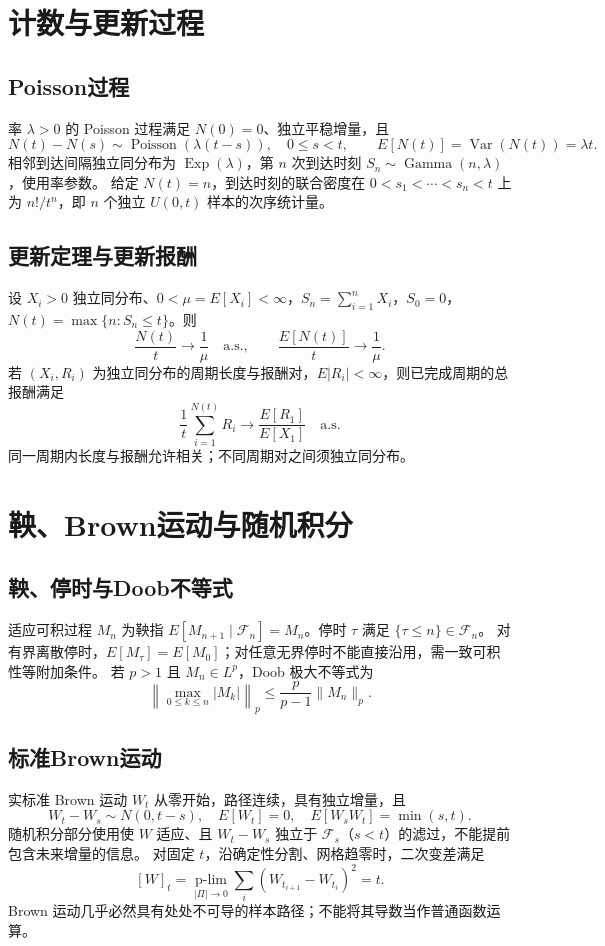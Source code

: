 \documentclass[../main.tex]{subfiles}
\begin{document}
\section{计数与更新过程}
\subsection{Poisson过程}
率 $\lambda>0$ 的 Poisson 过程满足 $N(0)=0$、独立平稳增量，且
\[
N(t)-N(s)\sim\operatorname{Poisson}(\lambda(t-s)),\quad0\le s<t,
\qquad E[N(t)]=\operatorname{Var}(N(t))=\lambda t.
\]
相邻到达间隔独立同分布为 $\operatorname{Exp}(\lambda)$，第 $n$ 次到达时刻 $S_n\sim\operatorname{Gamma}(n,\lambda)$，使用率参数。
给定 $N(t)=n$，到达时刻的联合密度在 $0<s_1<\cdots<s_n<t$ 上为 $n!/t^n$，即 $n$ 个独立 $U(0,t)$ 样本的次序统计量。
\subsection{更新定理与更新报酬}
设 $X_i>0$ 独立同分布、$0<\mu=E[X_i]<\infty$，$S_n=\sum_{i=1}^nX_i$，$S_0=0$，$N(t)=\max\{n:S_n\le t\}$。则
\[
\frac{N(t)}t\to\frac1\mu\quad\text{a.s.},\qquad
\frac{E[N(t)]}t\to\frac1\mu.
\]
若 $(X_i,R_i)$ 为独立同分布的周期长度与报酬对，$E|R_i|<\infty$，则已完成周期的总报酬满足
\[
\frac1t\sum_{i=1}^{N(t)}R_i\to\frac{E[R_1]}{E[X_1]}\quad\text{a.s.}
\]
同一周期内长度与报酬允许相关；不同周期对之间须独立同分布。
\section{鞅、Brown运动与随机积分}
\subsection{鞅、停时与Doob不等式}
适应可积过程 $M_n$ 为鞅指 $E[M_{n+1}\mid\mathcal F_n]=M_n$。停时 $\tau$ 满足 $\{\tau\le n\}\in\mathcal F_n$。
对有界离散停时，$E[M_\tau]=E[M_0]$；对任意无界停时不能直接沿用，需一致可积性等附加条件。
若 $p>1$ 且 $M_n\in L^p$，Doob 极大不等式为
\[
\left\|\max_{0\le k\le n}|M_k|\right\|_p\le\frac p{p-1}\|M_n\|_p.
\]
\subsection{标准Brown运动}
实标准 Brown 运动 $W_t$ 从零开始，路径连续，具有独立增量，且
\[
W_t-W_s\sim N(0,t-s),\quad E[W_t]=0,\quad E[W_sW_t]=\min(s,t).
\]
随机积分部分使用使 $W$ 适应、且 $W_t-W_s$ 独立于 $\mathcal F_s$（$s<t$）的滤过，不能提前包含未来增量的信息。
对固定 $t$，沿确定性分割、网格趋零时，二次变差满足
\[
[W]_t=\underset{|\Pi|\to0}{\operatorname{p-lim}}\sum_i(W_{t_{i+1}}-W_{t_i})^2=t.
\]
Brown 运动几乎必然具有处处不可导的样本路径；不能将其导数当作普通函数运算。
\end{document}

